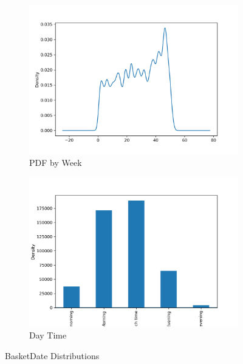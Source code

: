 \begin{figure}[!h]
\begin{subfigure}{.5\textwidth}
\includegraphics[width=.9\textwidth]{img/week_kde.png}
\caption{PDF by Week}
\label{fig:week_kde}
\end{subfigure}
\begin{subfigure}{.5\textwidth}
\centering
\includegraphics[width=.9\textwidth]{img/daytime_bar.png}
\caption{Day Time}
\label{fig:daytime_bar}
\end{subfigure}
\caption{BasketDate Distributions}
\end{figure}


